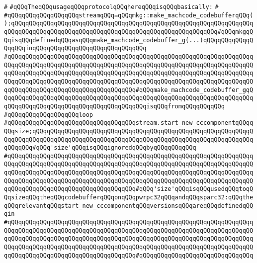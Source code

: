 \verb|#|\newline
\verb|#qQQqTheqQQqusageqQQqprotocolqQQqhereqQQqisqQQqbasically:|\newline
\verb|#|\newline
\verb|#qQQqqQQqqQQqqQQqqQQqstreamqQQq=qQQqmkg::make_machcode_codebufferqQQq();qQQqqQQqqQQqqQQqqQQqqQQqqQQqqQQqqQQqqQQqqQQqqQQqqQQqqQQqqQQqqQQqqQQqqQQqqQQqqQQqqQQqqQQqqQQqqQQqqQQqqQQqqQQqqQQqqQQqqQQqqQQqqQQq#qQQqmkgqQQqisqQQqdefinedqQQqasqQQqmake_machcode_codebuffer_g(...)qQQqqQQqqQQqqQQqqQQqinqQQqqQQqqQQqqQQqqQQqqQQqqQQqqQQq|\newline
\verb|#qQQqqQQqqQQqqQQqqQQqqQQqqQQqqQQqqQQqqQQqqQQqqQQqqQQqqQQqqQQqqQQqqQQqqQQqqQQqqQQqqQQqqQQqqQQqqQQqqQQqqQQqqQQqqQQqqQQqqQQqqQQqqQQqqQQqqQQqqQQqqQQqqQQqqQQqqQQqqQQqqQQqqQQqqQQqqQQqqQQqqQQqqQQqqQQqqQQqqQQqqQQqqQQqqQQqqQQqqQQqqQQqqQQqqQQqqQQqqQQqqQQqqQQqqQQqqQQqqQQqqQQqqQQqqQQqqQQqqQQqqQQqqQQqqQQqqQQqqQQqqQQqqQQqqQQqqQQq#qQQqmake_machcode_codebuffer_gqQQqqQQqqQQqqQQqqQQqqQQqqQQqqQQqqQQqqQQqqQQqqQQqqQQqqQQqqQQqqQQqqQQqqQQqqQQqqQQqqQQqqQQqqQQqqQQqqQQqqQQqqQQqqQQqisqQQqfromqQQqqQQqqQQq|\newline
\verb|#qQQqqQQqqQQqqQQqqQQqloop|\newline
\verb|#qQQqqQQqqQQqqQQqqQQqqQQqqQQqqQQqqQQqstream.start_new_cccomponentqQQqqQQqsize;qQQqqQQqqQQqqQQqqQQqqQQqqQQqqQQqqQQqqQQqqQQqqQQqqQQqqQQqqQQqqQQqqQQqqQQqqQQqqQQqqQQqqQQqqQQqqQQqqQQqqQQqqQQqqQQqqQQqqQQqqQQqqQQqqQQqqQQqqQQq#qQQq'size'qQQqisqQQqignoredqQQqbyqQQqqQQqqQQq|\newline
\verb|#qQQqqQQqqQQqqQQqqQQqqQQqqQQqqQQqqQQqqQQqqQQqqQQqqQQqqQQqqQQqqQQqqQQqqQQqqQQqqQQqqQQqqQQqqQQqqQQqqQQqqQQqqQQqqQQqqQQqqQQqqQQqqQQqqQQqqQQqqQQqqQQqqQQqqQQqqQQqqQQqqQQqqQQqqQQqqQQqqQQqqQQqqQQqqQQqqQQqqQQqqQQqqQQqqQQqqQQqqQQqqQQqqQQqqQQqqQQqqQQqqQQqqQQqqQQqqQQqqQQqqQQqqQQqqQQqqQQqqQQqqQQqqQQqqQQqqQQqqQQqqQQqqQQqqQQqqQQq#qQQq'size'qQQqisqQQqusedqQQqtoqQQqsizeqQQqtheqQQqcodebufferqQQqonqQQqpwrpc32qQQqandqQQqsparc32:qQQqtheqQQqrelevantqQQqstart_new_cccomponentqQQqversionsqQQqareqQQqdefinedqQQqin|\newline
\verb|#qQQqqQQqqQQqqQQqqQQqqQQqqQQqqQQqqQQqqQQqqQQqqQQqqQQqqQQqqQQqqQQqqQQqqQQqqQQqqQQqqQQqqQQqqQQqqQQqqQQqqQQqqQQqqQQqqQQqqQQqqQQqqQQqqQQqqQQqqQQqqQQqqQQqqQQqqQQqqQQqqQQqqQQqqQQqqQQqqQQqqQQqqQQqqQQqqQQqqQQqqQQqqQQqqQQqqQQqqQQqqQQqqQQqqQQqqQQqqQQqqQQqqQQqqQQqqQQqqQQqqQQqqQQqqQQqqQQqqQQqqQQqqQQqqQQqqQQqqQQqqQQqqQQqqQQqqQQq#qQQqqQQqqQQqqQQqqQQqqQQqqQQqqQQq|\newline
